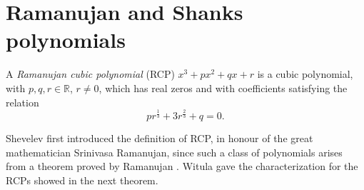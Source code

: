\documentclass[12pt,reqno]{article}
\begin{document}
\section{Ramanujan and Shanks polynomials}

\begin{definition} A \emph{Ramanujan cubic polynomial} (RCP) $x^3+px^2+qx+r$ is a cubic polynomial, with $p,q,r \in \mathbb R$, $r\not = 0$, which has real zeros and with coefficients satisfying the relation
\begin{equation} \label{cond1-rcp} pr^{\frac{1}{3}}+3r^{\frac{2}{3}}+q=0. \end{equation}
\end{definition}
Shevelev \cite{She} first introduced the definition of RCP, in honour of the great mathematician Srinivasa Ramanujan, since such a class of polynomials arises from a theorem proved by Ramanujan \cite{Rama}. Witula  \cite{Witula} gave the characterization for the RCPs showed in the next theorem.
\end{document}
